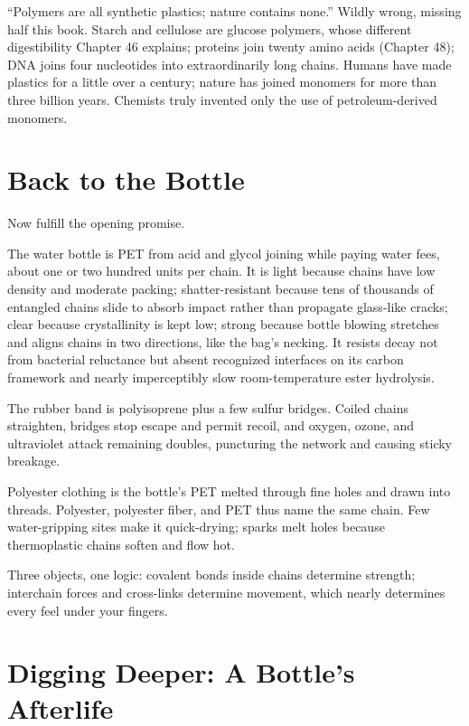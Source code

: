 \begin{wuqu}
``Polymers are all synthetic plastics; nature contains none.'' Wildly wrong, missing half this book. Starch and cellulose are glucose polymers, whose different digestibility Chapter 46 explains; proteins join twenty amino acids (Chapter 48); DNA joins four nucleotides into extraordinarily long chains. Humans have made plastics for a little over a century; nature has joined monomers for more than three billion years. Chemists truly invented only the use of petroleum-derived monomers.
\end{wuqu}

\section{Back to the Bottle}

Now fulfill the opening promise.

The water bottle is PET from acid and glycol joining while paying water fees, about one or two hundred units per chain. It is light because chains have low density and moderate packing; shatter-resistant because tens of thousands of entangled chains slide to absorb impact rather than propagate glass-like cracks; clear because crystallinity is kept low; strong because bottle blowing stretches and aligns chains in two directions, like the bag's necking. It resists decay not from bacterial reluctance but absent recognized interfaces on its carbon framework and nearly imperceptibly slow room-temperature ester hydrolysis.

The rubber band is polyisoprene plus a few sulfur bridges. Coiled chains straighten, bridges stop escape and permit recoil, and oxygen, ozone, and ultraviolet attack remaining doubles, puncturing the network and causing sticky breakage.

Polyester clothing is the bottle's PET melted through fine holes and drawn into threads. Polyester, polyester fiber, and PET thus name the same chain. Few water-gripping sites make it quick-drying; sparks melt holes because thermoplastic chains soften and flow hot.

Three objects, one logic: covalent bonds inside chains determine strength; interchain forces and cross-links determine movement, which nearly determines every feel under your fingers.

\section{Digging Deeper: A Bottle's Afterlife}

